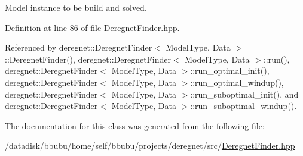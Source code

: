 Model instance to be build and solved. 



Definition at line 86 of file Deregnet\+Finder.\+hpp.



Referenced by deregnet\+::\+Deregnet\+Finder$<$ Model\+Type, Data $>$\+::\+Deregnet\+Finder(), deregnet\+::\+Deregnet\+Finder$<$ Model\+Type, Data $>$\+::run(), deregnet\+::\+Deregnet\+Finder$<$ Model\+Type, Data $>$\+::run\+\_\+optimal\+\_\+init(), deregnet\+::\+Deregnet\+Finder$<$ Model\+Type, Data $>$\+::run\+\_\+optimal\+\_\+windup(), deregnet\+::\+Deregnet\+Finder$<$ Model\+Type, Data $>$\+::run\+\_\+suboptimal\+\_\+init(), and deregnet\+::\+Deregnet\+Finder$<$ Model\+Type, Data $>$\+::run\+\_\+suboptimal\+\_\+windup().



The documentation for this class was generated from the following file\+:\begin{DoxyCompactItemize}
\item 
/datadisk/bbubu/home/self/bbubu/projects/deregnet/src/\hyperlink{DeregnetFinder_8hpp}{Deregnet\+Finder.\+hpp}\end{DoxyCompactItemize}
